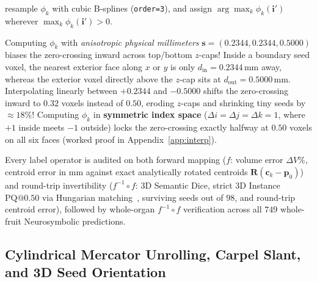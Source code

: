 \documentclass[10pt,a4paper]{article}
\renewcommand{\_}{\origunderscore\allowbreak}
\begin{document}
\begin{enumerate}
    resample $\phi_k$ with cubic B-splines (\texttt{order=3}), and assign $\arg\max_k \phi_k(\mathbf{i}')$ wherever $\max_k \phi_k(\mathbf{i}') > 0$.
    \begin{clinbox}
    Computing $\phi_k$ with \emph{anisotropic physical millimeters} $\mathbf{s}=(0.2344, 0.2344, 0.5000)$ biases the zero-crossing inward across top/bottom $z$-caps! Inside a boundary seed voxel, the nearest exterior face along $x$ or $y$ is only $d_{\text{in}} = 0.2344\,\text{mm}$ away, whereas the exterior voxel directly above the $z$-cap sits at $d_{\text{out}} = 0.5000\,\text{mm}$. Interpolating linearly between $+0.2344$ and $-0.5000$ shifts the zero-crossing inward to $0.32$ voxels instead of $0.50$, eroding $z$-caps and shrinking tiny seeds by $\approx 18\%$! Computing $\phi_k$ in \textbf{symmetric index space} ($\Delta i = \Delta j = \Delta k = 1$, where $+1$ inside meets $-1$ outside) locks the zero-crossing exactly halfway at $0.50$ voxels on all six faces (worked proof in Appendix~\ref{app:interp}).
    \end{clinbox}
\end{enumerate}

Every label operator is audited on both forward mapping ($f$: volume error $\Delta V\%$, centroid error in mm against exact analytically rotated centroids $\mathbf{R}(\mathbf{c}_k - \mathbf{p}_0)$) and round-trip invertibility ($f^{-1}\circ f$: 3D Semantic Dice, strict 3D Instance $\text{PQ@0.50}$ via Hungarian matching~\cite{kuhn1955hungarian,kirillov2019panoptic}, surviving seeds out of $98$, and round-trip centroid error), followed by whole-organ $f^{-1}\circ f$ verification across all $749$ whole-fruit Neurosymbolic predictions.

\subsection{Cylindrical Mercator Unrolling, Carpel Slant, and 3D Seed Orientation}
\label{sec:meth_mercator}
\end{document}
